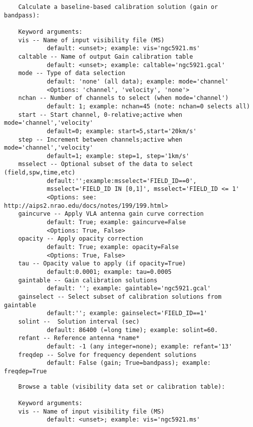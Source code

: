 \vspace{3mm}
\small
\begin{verbatim}
    Calculate a baseline-based calibration solution (gain or bandpass):
    
    Keyword arguments:
    vis -- Name of input visibility file (MS)
            default: <unset>; example: vis='ngc5921.ms'
    caltable -- Name of output Gain calibration table
            default: <unset>; example: caltable='ngc5921.gcal'
    mode -- Type of data selection
            default: 'none' (all data); example: mode='channel'
            <Options: 'channel', 'velocity', 'none'>
    nchan -- Number of channels to select (when mode='channel')
            default: 1; example: nchan=45 (note: nchan=0 selects all)
    start -- Start channel, 0-relative;active when mode='channel','velocity'
            default=0; example: start=5,start='20km/s'
    step -- Increment between channels;active when mode='channel','velocity'
            default=1; example: step=1, step='1km/s'
    msselect -- Optional subset of the data to select (field,spw,time,etc)
            default:'';example:msselect='FIELD_ID==0', 
            msselect='FIELD_ID IN [0,1]', msselect='FIELD_ID <= 1'
            <Options: see: http://aips2.nrao.edu/docs/notes/199/199.html>
    gaincurve -- Apply VLA antenna gain curve correction
            default: True; example: gaincurve=False
            <Options: True, False>
    opacity -- Apply opacity correction
            default: True; example: opacity=False
            <Options: True, False>
    tau -- Opacity value to apply (if opacity=True)
            default:0.0001; example: tau=0.0005
    gaintable -- Gain calibration solutions
            default: ''; example: gaintable='ngc5921.gcal'
    gainselect -- Select subset of calibration solutions from gaintable
            default:''; example: gainselect='FIELD_ID==1'
    solint --  Solution interval (sec)
            default: 86400 (=long time); example: solint=60.
    refant -- Reference antenna *name*
            default: -1 (any integer=none); example: refant='13'
    freqdep -- Solve for frequency dependent solutions
            default: False (gain; True=bandpass); example: freqdep=True
\end{verbatim}
\normalsize

\vspace{3mm}
\small
\begin{verbatim}
    Browse a table (visibility data set or calibration table):
    
    Keyword arguments:
    vis -- Name of input visibility file (MS)
            default: <unset>; example: vis='ngc5921.ms'

\end{verbatim}
\normalsize

